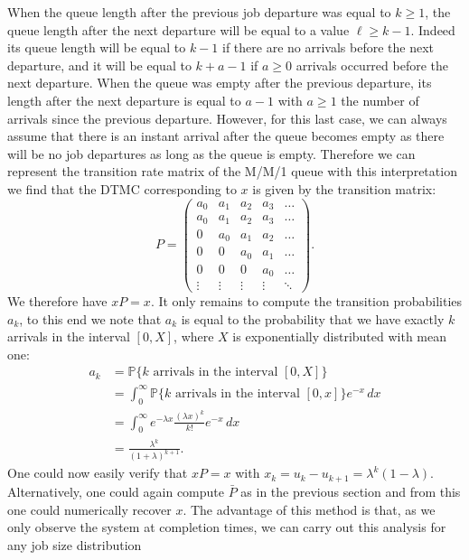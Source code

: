 \documentclass[12pt]{report}
\renewcommand{\P}{\mathbb{P}}
\renewcommand{\P}{\mathbb{P}}
\begin{document}
\begin{appendices}
When the queue length after the previous job departure was equal to $k \geq 1$, the queue length after the next departure will be equal to a value $\ell \geq k-1$. Indeed its queue length will be equal to $k-1$ if there are no arrivals before the next departure, and it will be equal to $k+a-1$ if $a \geq 0$ arrivals occurred before the next departure. When the queue was empty after the previous departure, its length after the next departure is equal to $a-1$ with $a\geq 1$ the number of arrivals since the previous departure. However, for this last case, we can always assume that there is an instant arrival after the queue becomes empty as there will be no job departures as long as the queue is empty. Therefore we can represent the transition rate matrix of the M/M/1 queue with this interpretation we find that the DTMC corresponding to $x$ is given by the transition matrix:
$$
P = \begin{pmatrix}
a_0 & a_1 & a_2 & a_3 & \dots \\
a_0 & a_1 & a_2 & a_3 & \dots \\
0 & a_0 & a_1 & a_2 & \dots \\
0 & 0 & a_0 & a_1 & \dots\\
0 & 0 & 0 & a_0 & \dots\\
\vdots & \vdots & \vdots & \vdots & \ddots
\end{pmatrix}.
$$
We therefore have $xP = x$. It only remains to compute the transition probabilities $a_k$, to this end we note that $a_k$ is equal to the probability that we have exactly $k$ arrivals in the interval $[0,X]$, where $X$ is exponentially distributed with mean one:
\begin{align*}
a_k
&= \P\{ k \mbox{ arrivals in the interval } [0, X] \}\\
&= \int_0^\infty \P\{ k \mbox{ arrivals in the interval } [0, x] \} e^{-x} \, dx\\
&= \int_0^\infty e^{-\lambda x} \frac{(\lambda x)^k}{k!} e^{-x} \, dx\\
&= \frac{\lambda^k}{(1+\lambda)^{k+1}}.
\end{align*}
One could now easily verify that $xP = x$ with $x_k = u_k - u_{k+1} = \lambda^k (1-\lambda)$. Alternatively, one could again compute $\bar P$ as in the previous section and from this one could numerically recover $x$. The advantage of this method is that, as we only observe the system at completion times, we can carry out this analysis for any job size distribution


\end{appendices}
\end{document}
